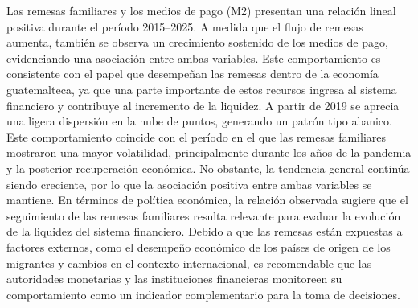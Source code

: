 Las remesas familiares y los medios de pago (M2) presentan una relación lineal positiva durante el período 2015–2025. A medida que el flujo de remesas aumenta, también se observa un crecimiento sostenido de los medios de pago, evidenciando una asociación entre ambas variables. Este comportamiento es consistente con el papel que desempeñan las remesas dentro de la economía guatemalteca, ya que una parte importante de estos recursos ingresa al sistema financiero y contribuye al incremento de la liquidez.
A partir de 2019 se aprecia una ligera dispersión en la nube de puntos, generando un patrón tipo abanico. Este comportamiento coincide con el período en el que las remesas familiares mostraron una mayor volatilidad, principalmente durante los años de la pandemia y la posterior recuperación económica. No obstante, la tendencia general continúa siendo creciente, por lo que la asociación positiva entre ambas variables se mantiene.
En términos de política económica, la relación observada sugiere que el seguimiento de las remesas familiares resulta relevante para evaluar la evolución de la liquidez del sistema financiero. Debido a que las remesas están expuestas a factores externos, como el desempeño económico de los países de origen de los migrantes y cambios en el contexto internacional, es recomendable que las autoridades monetarias y las instituciones financieras monitoreen su comportamiento como un indicador complementario para la toma de decisiones.